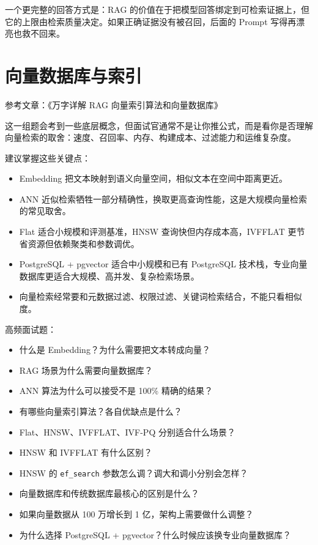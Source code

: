 \documentclass[10pt,a4paper]{ctexart}
\begin{document}
一个更完整的回答方式是：RAG 的价值在于把模型回答绑定到可检索证据上，但它的上限由检索质量决定。如果正确证据没有被召回，后面的 Prompt 写得再漂亮也救不回来。



\section{向量数据库与索引}


参考文章：《万字详解 RAG 向量索引算法和向量数据库》



这一组题会考到一些底层概念，但面试官通常不是让你推公式，而是看你是否理解向量检索的取舍：速度、召回率、内存、构建成本、过滤能力和运维复杂度。



建议掌握这些关键点：


\begin{itemize}[itemsep=2pt, topsep=4pt]
  \item Embedding 把文本映射到语义向量空间，相似文本在空间中距离更近。
  \item ANN 近似检索牺牲一部分精确性，换取更高查询性能，这是大规模向量检索的常见取舍。
  \item Flat 适合小规模和评测基准，HNSW 查询快但内存成本高，IVFFLAT 更节省资源但依赖聚类和参数调优。
  \item PostgreSQL + pgvector 适合中小规模和已有 PostgreSQL 技术栈，专业向量数据库更适合大规模、高并发、复杂检索场景。
  \item 向量检索经常要和元数据过滤、权限过滤、关键词检索结合，不能只看相似度。
\end{itemize}


高频面试题：


\begin{itemize}[itemsep=2pt, topsep=4pt]
  \item 什么是 Embedding？为什么需要把文本转成向量？
  \item RAG 场景为什么需要向量数据库？
  \item ANN 算法为什么可以接受不是 100\% 精确的结果？
  \item 有哪些向量索引算法？各自优缺点是什么？
  \item Flat、HNSW、IVFFLAT、IVF-PQ 分别适合什么场景？
  \item HNSW 和 IVFFLAT 有什么区别？
  \item HNSW 的 \texttt{ef\_search} 参数怎么调？调大和调小分别会怎样？
  \item 向量数据库和传统数据库最核心的区别是什么？
  \item 如果向量数据从 100 万增长到 1 亿，架构上需要做什么调整？
  \item 为什么选择 PostgreSQL + pgvector？什么时候应该换专业向量数据库？
\end{itemize}
\end{document}
